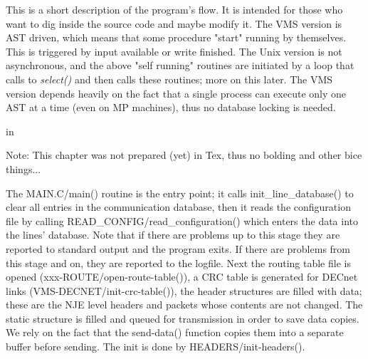 \vfill\eject


This is a short description of the program's flow. It is intended for
those who want to dig inside the source code and maybe modify it.
The  VMS  version  is  AST  driven,  which  means that some procedure
"start" running by themselves. This is triggered by input  available  or
write  finished.  The  Unix  version  is not asynchronous, and the above
"self running" routines are initiated by a loop that calls  to  {\sl select()}
and  then  calls  these  routines;  more  on this later. The VMS version
depends heavily on the fact that a single process can execute  only  one
AST  at  a  time  (even  on  MP  machines),  thus no database locking is
needed.

 in

{\ncrBold Note:} This chapter was not prepared (yet) in Tex, thus no bolding
and other bice things...

The  {\ncrBold MAIN.C/main()} routine is  the  entry point; it calls
{\ncrBold init\_line\_database()}
 to clear all entries in the communication database,
then it  reads  the  configuration  file  by  calling
{\ncrBold READ\_CONFIG/read\_configuration() }
which  enters  the  data into the lines' database. Note
that if there are problems  up  to  this  stage  they  are  reported  to
standard  output  and the program exits. If there are problems from this
stage and on, they are reported to the logfile. Next the  routing  table
file  is opened (xxx-ROUTE/open-route-table()), a CRC table is generated
for DECnet links (VMS-DECNET/init-crc-table()),  the  header  structures
are  filled with data; these are the NJE level headers and packets whose
contents are not changed. The static structure is filled and queued  for
transmission  in order to save data copies. We rely on the fact that the
send-data() function copies them into a separate buffer before  sending.
The init is done by HEADERS/init-headers().

